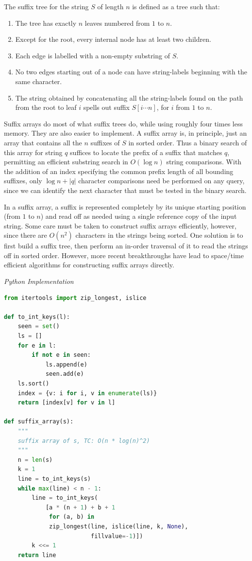 \documentclass{article}
\begin{document}
    The suffix tree for the string $S$ of length $n$ is defined as a tree such that:
    \begin{enumerate}
        \item The tree has exactly $n$ leaves numbered from $1$ to $n$.
        \item Except for the root, every internal node has at least two children.
        \item Each edge is labelled with a non-empty substring of $S$.
        \item No two edges starting out of a node can have string-labels beginning with the same character.
        \item The string obtained by concatenating all the string-labels found on the path from the root to leaf $i$ spells out suffix $S[i \cdots n]$, for $i$ from $1$ to $n$.
    \end{enumerate}
    Suffix arrays do most of what suffix trees do, while using roughly four times less memory. They are also easier to implement. A suffix array is, in principle, just an array that contains all the $n$ suffixes of $S$ in sorted order. Thus a binary search of this array for string $q$ suffices to locate the prefix of a suffix that matches $q$, permitting an efficient substring search in $O(\log n)$ string comparisons. With the addition of an index specifying the common prefix length of all bounding suffixes, only $\log n+|q|$ character comparisons need be performed on any query, since we can identify the next character that must be tested in the binary search.
    
    In a suffix array, a suffix is represented completely by its unique starting position (from $1$ to $n$) and read off as needed using a single reference copy of the input string. Some care must be taken to construct suffix arrays efficiently, however, since there are $O(n^2)$ characters in the strings being sorted. One solution is to first build a suffix tree, then perform an in-order traversal of it to read the strings off in sorted order. However, more recent breakthroughs have lead to space/time efficient algorithms for constructing suffix arrays directly.

\vspace{8pt} \emph{Python Implementation}
\begin{lstlisting}[language=Python]
from itertools import zip_longest, islice

def to_int_keys(l):
    seen = set()
    ls = []
    for e in l:
        if not e in seen:
            ls.append(e)
            seen.add(e)
    ls.sort()
    index = {v: i for i, v in enumerate(ls)}
    return [index[v] for v in l]

def suffix_array(s):
    """
    suffix array of s, TC: O(n * log(n)^2)
    """
    n = len(s)
    k = 1
    line = to_int_keys(s)
    while max(line) < n - 1:
        line = to_int_keys(
            [a * (n + 1) + b + 1
             for (a, b) in
             zip_longest(line, islice(line, k, None),
                         fillvalue=-1)])
        k <<= 1
    return line
\end{lstlisting}
    
\end{document}
